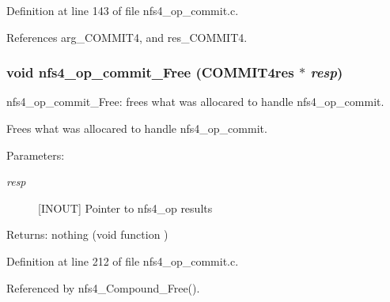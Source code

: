 Definition at line 143 of file nfs4\_\-op\_\-commit.c.

References arg\_\-COMMIT4, and res\_\-COMMIT4.
\subsubsection{\setlength{\rightskip}{0pt plus 5cm}void nfs4\_\-op\_\-commit\_\-Free (COMMIT4res $\ast$ {\em resp})}\label{nfs4__op__commit_8c_a3}


nfs4\_\-op\_\-commit\_\-Free: frees what was allocared to handle nfs4\_\-op\_\-commit.

Frees what was allocared to handle nfs4\_\-op\_\-commit.

\begin{Desc}
\item[Parameters:]
\begin{description}
\item[{\em resp}][INOUT] Pointer to nfs4\_\-op results\end{description}
\end{Desc}
\begin{Desc}
\item[Returns:]nothing (void function ) \end{Desc}


Definition at line 212 of file nfs4\_\-op\_\-commit.c.

Referenced by nfs4\_\-Compound\_\-Free().